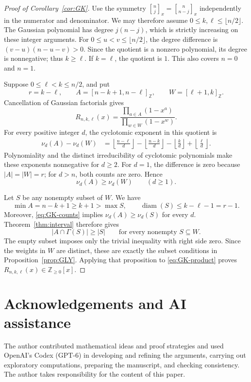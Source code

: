 \documentclass[11pt]{article}
\theoremstyle{definition}
\theoremstyle{remark}
\newcommand{\ZZ}{\mathbb Z}
\DeclareMathOperator{\diam}{diam}
\newcommand{\iv}[2]{[#1,#2]_{\ZZ}}
\newcommand{\Ga}{\Gamma}
\newcommand{\qbinom}[2]{\genfrac{[}{]}{0pt}{}{#1}{#2}}
\begin{document}
\begin{proof}[Proof of Corollary~\ref{cor:GK}]
Use the symmetry $\qbinom{n}{j}_x=\qbinom{n}{n-j}_x$ independently in the
numerator and denominator. We may therefore assume
$0\leq k,\ell\leq\lfloor n/2\rfloor$. The Gaussian polynomial has
degree $j(n-j)$, which is strictly increasing on these integer arguments.
For $0\leq u<v\leq\lfloor n/2\rfloor$, the degree difference is
$(v-u)(n-u-v)>0$. Since the quotient is a nonzero polynomial, its
degree is nonnegative; thus $k\geq\ell$. If $k=\ell$, the quotient
is $1$. This also covers $n=0$ and $n=1$.

Suppose $0\leq\ell<k\leq n/2$, and put
\[
 r=k-\ell,\qquad
 A=\iv{n-k+1}{n-\ell},\qquad
 W=\iv{\ell+1}{k}.
\]
Cancellation of Gaussian factorials gives
\begin{equation}\label{eq:GK-product}
 R_{n,k,\ell}(x)
 =\frac{\prod_{a\in A}(1-x^a)}{\prod_{w\in W}(1-x^w)}.
\end{equation}
For every positive integer $d$, the cyclotomic exponent in this quotient
is
\begin{align*}
 \nu_d(A)-\nu_d(W)
 &=\left\lfloor\frac{n-\ell}{d}\right\rfloor
   -\left\lfloor\frac{n-k}{d}\right\rfloor
   -\left\lfloor\frac{k}{d}\right\rfloor
   +\left\lfloor\frac{\ell}{d}\right\rfloor.
\end{align*}
Polynomiality and the distinct irreducibility of cyclotomic polynomials
make these exponents nonnegative for $d\geq2$. For $d=1$, the difference
is zero because $|A|=|W|=r$; for $d>n$, both counts are zero. Hence
\begin{equation}\label{eq:GK-counts}
 \nu_d(A)\geq\nu_d(W)\qquad(d\geq1).
\end{equation}

Let $S$ be any nonempty subset of $W$. We have
\[
 \min A=n-k+1\geq k+1>\max S,
 \qquad \diam(S)\leq k-\ell-1=r-1.
\]
Moreover, \eqref{eq:GK-counts} implies
$\nu_d(A)\geq\nu_d(S)$ for every $d$. Theorem~\ref{thm:interval}
therefore gives
\[
 |A\cap\Ga(S)|\geq |S|
 \qquad\text{for every nonempty }S\subseteq W.
\]
The empty subset imposes only the trivial inequality with right side
zero. Since the weights in $W$ are distinct, these are exactly the
subset conditions in Proposition~\ref{prop:GLY}. Applying that proposition
to \eqref{eq:GK-product} proves
$R_{n,k,\ell}(x)\in\ZZ_{\geq0}[x]$.
\end{proof}

\section*{Acknowledgements and AI assistance}
The author contributed mathematical ideas and proof strategies and used
OpenAI's Codex (GPT-6) in developing and refining the arguments, carrying
out exploratory computations, preparing the manuscript, and checking
consistency. The author takes responsibility for the content of this paper.
\end{document}
